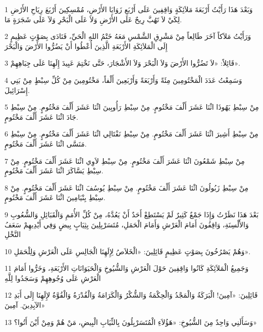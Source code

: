 \par 1 وَبَعْدَ هَذَا رَأَيْتُ أَرْبَعَةَ مَلاَئِكَةٍ وَاقِفِينَ عَلَى أَرْبَعِ زَوَايَا الأَرْضِ، مُمْسِكِينَ أَرْبَعَ رِيَاحِ الأَرْضِ لِكَيْ لاَ تَهُبَّ رِيحٌ عَلَى الأَرْضِ وَلاَ عَلَى الْبَحْرِ وَلاَ عَلَى شَجَرَةٍ مَا.
\par 2 وَرَأَيْتُ مَلاَكاً آخَرَ طَالِعاً مِنْ مَشْرِقِ الشَّمْسِ مَعَهُ خَتْمُ اللهِ الْحَيِّ، فَنَادَى بِصَوْتٍ عَظِيمٍ إِلَى الْمَلاَئِكَةِ الأَرْبَعَةِ الَّذِينَ أُعْطُوا أَنْ يَضُرُّوا الأَرْضَ وَالْبَحْرَ
\par 3 قَائِلاً: «لاَ تَضُرُّوا الأَرْضَ وَلاَ الْبَحْرَ وَلاَ الأَشْجَارَ، حَتَّى نَخْتِمَ عَبِيدَ إِلَهِنَا عَلَى جِبَاهِهِمْ».
\par 4 وَسَمِعْتُ عَدَدَ الْمَخْتُومِينَ مِئَةً وَأَرْبَعَةً وَأَرْبَعِينَ أَلْفاً، مَخْتُومِينَ مِنْ كُلِّ سِبْطٍ مِنْ بَنِي إِسْرَائِيلَ.
\par 5 مِنْ سِبْطِ يَهُوذَا اثْنَا عَشَرَ أَلْفَ مَخْتُومٍ. مِنْ سِبْطِ رَأُوبِينَ اثْنَا عَشَرَ أَلْفَ مَخْتُومٍ. مِنْ سِبْطِ جَادَ اثْنَا عَشَرَ أَلْفَ مَخْتُومٍ.
\par 6 مِنْ سِبْطِ أَشِيرَ اثْنَا عَشَرَ أَلْفَ مَخْتُومٍ. مِنْ سِبْطِ نَفْتَالِي اثْنَا عَشَرَ أَلْفَ مَخْتُومٍ. مِنْ سِبْطِ مَنَسَّى اثْنَا عَشَرَ أَلْفَ مَخْتُومٍ.
\par 7 مِنْ سِبْطِ شَمْعُونَ اثْنَا عَشَرَ أَلْفَ مَخْتُومٍ. مِنْ سِبْطِ لاَوِي اثْنَا عَشَرَ أَلْفَ مَخْتُومٍ. مِنْ سِبْطِ يَسَّاكَرَ اثْنَا عَشَرَ أَلْفَ مَخْتُومٍ.
\par 8 مِنْ سِبْطِ زَبُولُونَ اثْنَا عَشَرَ أَلْفَ مَخْتُومٍ. مِنْ سِبْطِ يُوسُفَ اثْنَا عَشَرَ أَلْفَ مَخْتُومٍ. مِنْ سِبْطِ بِنْيَامِينَ اثْنَا عَشَرَ أَلْفَ مَخْتُومٍ.
\par 9 بَعْدَ هَذَا نَظَرْتُ وَإِذَا جَمْعٌ كَثِيرٌ لَمْ يَسْتَطِعْ أَحَدٌ أَنْ يَعُدَّهُ، مِنْ كُلِّ الأُمَمِ وَالْقَبَائِلِ وَالشُّعُوبِ وَالأَلْسِنَةِ، وَاقِفُونَ أَمَامَ الْعَرْشِ وَأَمَامَ الْحَمَلِ، مُتَسَرْبِلِينَ بِثِيَابٍ بِيضٍ وَفِي أَيْدِيهِمْ سَعَفُ النَّخْلِ
\par 10 وَهُمْ يَصْرُخُونَ بِصَوْتٍ عَظِيمٍ قَائِلِينَ: «الْخَلاَصُ لِإِلَهِنَا الْجَالِسِ عَلَى الْعَرْشِ وَلِلْحَمَلِ».
\par 11 وَجَمِيعُ الْمَلاَئِكَةِ كَانُوا وَاقِفِينَ حَوْلَ الْعَرْشِ وَالشُّيُوخِ وَالْحَيَوَانَاتِ الأَرْبَعَةِ، وَخَرُّوا أَمَامَ الْعَرْشِ عَلَى وُجُوهِهِمْ وَسَجَدُوا لِلَّهِ
\par 12 قَائِلِينَ: «آمِينَ! الْبَرَكَةُ وَالْمَجْدُ وَالْحِكْمَةُ وَالشُّكْرُ وَالْكَرَامَةُ وَالْقُدْرَةُ وَالْقُوَّةُ لإِلَهِنَا إِلَى أَبَدِ الآبِدِينَ. آمِينَ»
\par 13 وَسَأَلَنِي وَاحِدٌ مِنَ الشُّيُوخِ: «هَؤُلاَءِ الْمُتَسَرْبِلُونَ بِالثِّيَابِ الْبِيضِ، مَنْ هُمْ وَمِنْ أَيْنَ أَتُوا؟»
